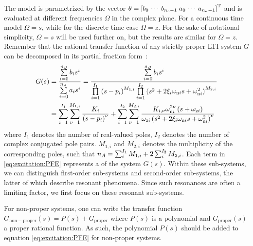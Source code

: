 The model is parametrized by the vector $\theta = \left[b_0 \,\cdots\, b_{n_b-1} \; a_0 \,\cdots\, a_{n_a-1} \right]^{\mathrm{T}}$ and  is evaluated at different frequencies $\Omega$ in the complex plane.
For a continuous time model $\Omega = s$, while for the discrete time case $\Omega = z$.
For the sake of notational simplicity, $\Omega = s$ will be used further on, but the results are similar for $\Omega=z$.
Remember that the rational transfer function of any strictly proper \gls{LTI} system $G$ can be decomposed in its partial fraction form~\citep[Appendix]{Oppenheim1996}:
\begin{align}
  G(s) &= 
    \frac{\sum\limits_{i=0}^{\numel{B}} b_i s^i}
              {\sum\limits_{i=0}^{\numel{A}} a_i s^i} 
        =    
   \frac{\sum\limits_{i=0}^{\numel{B}} b_i s^i}
              {\prod\limits_{i=1}^{I_1} \left( s - \pole[i] \right)^{M_{1,i}} 
               \prod\limits_{i=1}^{I_2} \left(s^2 + 2 \damping[i] \wn[i] s + \wn[i]^2 \right)^{M_{2,i}}}
        \\
        &  = 
        \sum_{i=1}^{I_1} 
          \sum_{\multiplicity=1}^{M_{1,i}} 
            \frac{\dc[i]}
                      { \left( s - \pole[i] \right)^{\multiplicity}}
            + 
        \sum_{i=1}^{I_2} 
          \sum_{\multiplicity=1}^{M_{2,i}}
           \frac{\dc[i,\multiplicity] \wn[i]^{2\multiplicity} \left( s + \wz[i] \right)}
                     {\wz[i] \left(s^2 + 2 \damping[i] \wn[i] s + \wn[i]^2 \right)^{\multiplicity}}
        \label{eq:excitation:PFE}
\end{align}
where $I_1$ denotes the number of real-valued poles, $I_2$ denotes the number of complex conjugated pole pairs.
$M_{1,i}$ and $M_{2,i}$ denotes the multiplicity of the corresponding poles, such that $n_{A} = \sum_i^{I_1} M_{1,i} + 2 \sum_{i}^{I_2} M_{2,i}$.
Each term in \eqref{eq:excitation:PFE} represents a  of the system $G(s)$.
  Within these sub-systems, we can distinguish first-order sub-systems and second-order sub-systems, the latter of which describe resonant phenomena.
  Since such resonances are often a limiting factor, we first focus on these resonant sub-systems.
\begin{remark}
  For non-proper systems, one can write the transfer function $G_{\mathrm{non-proper}}(s) = P(s) + G_{\mathrm{proper}}$ where $P(s)$ is a polynomial and $G_{\mathrm{proper}}(s)$ a proper rational function.
  As such, the polynomial $P(s)$ should be added to equation \eqref{eq:excitation:PFE} for non-proper systems.
\end{remark}

